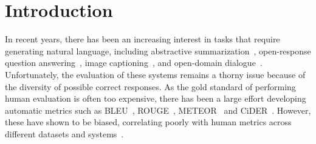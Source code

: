 \section{\label{sec:intro}Introduction}


In recent years, there has been an increasing interest in tasks that require generating natural language, including
  abstractive summarization~\citep{nallapati2016abstractive},
  open-response question answering~\citep{nguyen2016ms,kovcisky2017narrativeqa}, 
  image captioning~\citep{lin2014microsoft},
  and open-domain dialogue~\citep{lowe2017ubuntu}.
Unfortunately, the evaluation of these systems remains a thorny issue because of the diversity of possible correct responses.
As the gold standard of performing human evaluation is often too expensive,
there has been a large effort developing
automatic metrics such as BLEU~\citep{papineni02bleu}, ROUGE~\citep{lin2004rouge}, METEOR~\citep{lavie2009meteor,denkowski2014meteor} and CiDER~\citep{vedantam2015cider}.
However, these have shown to be biased, correlating poorly with human metrics across different datasets and systems~\citep{liu2016evaluate,novikova2017why}.

